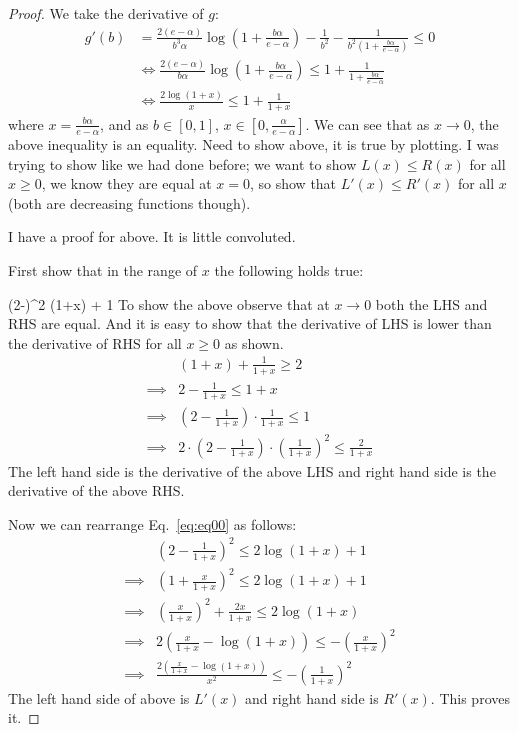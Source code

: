 \begin{proof}
We take the derivative of $g$:
\begin{align*}
g'(b) &= \frac{2(e-\alpha)}{b^3 \alpha} \log\left(1+\frac{b\alpha}{e-\alpha} \right) - \frac{1}{b^2}-\frac{1}{b^2\left(1+\frac{b\alpha}{e-\alpha}\right)} \leq 0 \\
&\iff \frac{2(e-\alpha)}{b \alpha} \log\left(1+\frac{b\alpha}{e-\alpha} \right) \leq 1+\frac{1}{1+\frac{b\alpha}{e-\alpha}} \\
&\iff \frac{2\log(1+x)}{x} \leq 1+\frac{1}{1+x}
\end{align*}
where $x = \frac{b\alpha}{e-\alpha}$, and as $b \in [0,1]$, $x \in [0, \frac{\alpha}{e-\alpha}]$. We can see that as $x \rightarrow 0$, the above inequality is an equality. 
{\nolan Need to show above, it is true by plotting. I was trying to show like we had done before; we want to show $L(x) \leq R(x)$ for all $x \geq 0$, we know they are equal at $x = 0$, so show that $L'(x) \leq R'(x)$ for all $x$ (both are decreasing functions though).}

{\arpit I have a proof for above. It is little convoluted.

First show that in the range of $x$ the following holds true:

\beq
\label{eq:eq00}
\left(2-\right)^2 \log(1+x) + 1
\eeq
To show the above observe that at $x\rightarrow 0$ both the LHS and RHS are equal. And it is easy to show that the derivative of LHS is lower than the derivative of RHS for all $x\ge 0$ as shown.
\begin{align*}
& (1+x) + \frac{1}{1+x} \ge 2\\
\implies & 2 - \frac{1}{1+x} \le 1 + x\\
\implies & (2-\frac{1}{1+x})\cdot \frac{1}{1+x} \le 1\\
\implies & 2\cdot(2-\frac{1}{1+x})\cdot (\frac{1}{1+x})^2 \le \frac{2}{1+x}
\end{align*}
The left hand side is the derivative of the above LHS and right hand side is the derivative of the above RHS.

Now we can rearrange Eq.~\ref{eq:eq00} as follows:
\begin{align*}
& \left(2-\frac{1}{1+x}\right)^2 \le 2\log(1+x) + 1\\
\implies & (1 + \frac{x}{1+x})^2 \le 2\log(1+x) + 1\\
\implies & (\frac{x}{1+x})^2 + \frac{2x}{1+x} \le 2\log(1+x)\\
\implies & 2\left(\frac{x}{1+x} - \log(1+x)\right) \le - (\frac{x}{1+x})^2\\
\implies & \frac{2\left(\frac{x}{1+x} - \log(1+x)\right)}{x^2} \le - (\frac{1}{1+x})^2
\end{align*}
The left hand side of above is $L'(x)$ and right hand side is $R'(x)$. This proves it.
}
\end{proof}

